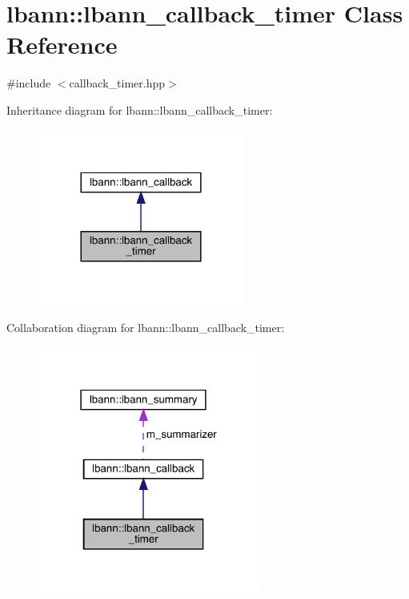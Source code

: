 \hypertarget{classlbann_1_1lbann__callback__timer}{}\section{lbann\+:\+:lbann\+\_\+callback\+\_\+timer Class Reference}
\label{classlbann_1_1lbann__callback__timer}


{\ttfamily \#include $<$callback\+\_\+timer.\+hpp$>$}



Inheritance diagram for lbann\+:\+:lbann\+\_\+callback\+\_\+timer\+:\nopagebreak
\begin{figure}[H]
\begin{center}
\leavevmode
\includegraphics[width=192pt]{classlbann_1_1lbann__callback__timer__inherit__graph}
\end{center}
\end{figure}


Collaboration diagram for lbann\+:\+:lbann\+\_\+callback\+\_\+timer\+:\nopagebreak
\begin{figure}[H]
\begin{center}
\leavevmode
\includegraphics[width=207pt]{classlbann_1_1lbann__callback__timer__coll__graph}
\end{center}
\end{figure}
